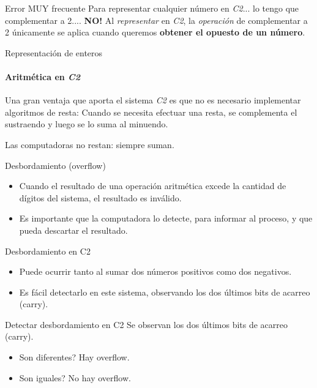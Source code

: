 \documentclass[11pt,a4paper,spanish]{beamer}
\begin{document}
\begin{frame}{Error MUY frecuente}
    Para representar cualquier número en \emph{C2}... lo tengo que
    complementar a 2....  \textbf{NO!}
    \pause
    Al \textit{representar} en \emph{C2}, la \textit{operación} de
    complementar a 2 únicamente se aplica cuando queremos \textbf{obtener el
    opuesto de un número}.
\end{frame}

\begin{frame}{Representación de enteros}
    \framesubtitle{Aritmética en \emph{C2}}

    Una gran ventaja que aporta el sistema \emph{C2} es que no es
            necesario implementar algoritmos de resta: Cuando se necesita
            efectuar una resta, se complementa el sustraendo y luego se lo
            suma al minuendo.

    Las computadoras no restan: siempre suman.
\end{frame}

\begin{frame}{Desbordamiento (overflow)}
\begin{itemize}
    \item Cuando el resultado de una operación aritmética excede la cantidad de dígitos del sistema, el resultado es inválido.
    \item Es importante que la computadora lo detecte, para informar al proceso, y que pueda descartar el resultado.
\end{itemize}
\end{frame}


\begin{frame}{Desbordamiento en C2}
    \begin{itemize}
    \item Puede ocurrir tanto al sumar dos números positivos como dos negativos.
    \item Es fácil detectarlo en este sistema, observando los dos últimos bits de acarreo (carry).
    \end{itemize}
\end{frame}

\begin{frame}{Detectar desbordamiento en C2}
Se observan los dos últimos bits de acarreo (carry).
    \begin{itemize}
    \item Son diferentes? Hay overflow.
    \item Son iguales? No hay overflow.
\end{itemize}
\end{frame}
\end{document}
